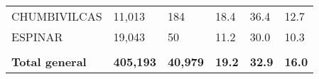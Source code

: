 \begin{tabular}{llllll}
	\cellcolor[HTML]{F8CBAD}CHUMBIVILCAS                           & 11,013                                                                & 184                                                              & 18.4                                                                             & 36.4                                                                        & 12.7                                                                                \\
	\cellcolor[HTML]{F8CBAD}ESPINAR                                & 19,043                                                                & 50                                                               & 11.2                                                                             & 30.0                                                                        & 10.3                                                                                \\
	&                                                                       &                                                                  &                                                                                  &                                                                             &                                                                                     \\
	\rowcolor[HTML]{DDEBF7} 
	\textbf{Total   general}                                       & \textbf{405,193}                                                      & \textbf{40,979}                                                  & \textbf{19.2}                                                                    & \textbf{32.9}                                                               & \textbf{16.0}                                                                      
\end{tabular}